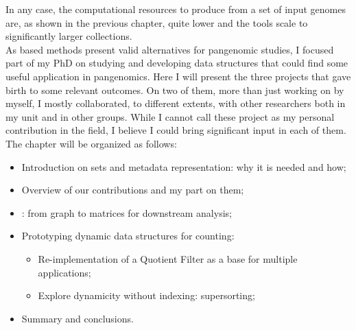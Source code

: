 In any case, the computational resources to produce \ccdbg from a set of input genomes are, as shown in the previous chapter, quite lower and the tools scale to significantly larger collections.\\
As \kmer based methods present valid alternatives for pangenomic studies, I focused part of my PhD on studying and developing data structures that could find some useful application in pangenomics. Here I will present the three projects that gave birth to some relevant outcomes. On two of them, more than just working on by myself, I mostly collaborated, to different extents, with other researchers both in my unit and in other groups. While I cannot call these project as my personal contribution in the field, I believe I could bring significant input in each of them.
The chapter will be organized as follows:
\begin{itemize}
	\item Introduction on \kmer sets and metadata representation: why it is needed and how;
	\item Overview of our contributions and my part on them;
	\item \muset: from graph to matrices for downstream analysis;
	\item Prototyping dynamic data structures for \kmer counting:
	\begin{itemize}
		\item Re-implementation of a Quotient Filter as a base for multiple applications;
		\item Explore dynamicity without indexing: super\kmer sorting;
	\end{itemize}
	\item Summary and conclusions.
\end{itemize}

